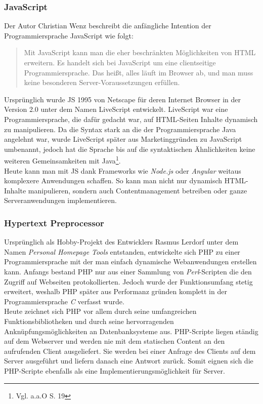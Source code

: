 \subsubsection*{JavaScript} 

Der Autor Christian Wenz beschreibt die anfängliche Intention der Programmiersprache JavaScript wie folgt:

\begin{quote}
Mit JavaScript kann man die eher beschränkten Möglichkeiten von HTML erweitern. Es handelt sich bei JavaScript um eine clientseitige Programmiersprache. Das heißt, alles läuft im Browser ab, und man muss keine besonderen Server-Voraussetzungen erfüllen\autocite[][18]{javascript}.
\end{quote}

Ursprünglich wurde \ac{JS} 1995 von Netscape für deren Internet Browser in der Version 2.0 unter dem Namen LiveScript entwickelt. LiveScript war eine Programmiersprache, die dafür gedacht war, auf \ac{HTML}-Seiten Inhalte dynamisch zu manipulieren. Da die Syntax stark an die der Programmiersprache Java angelehnt war, wurde LiveScript später aus Marketinggründen zu JavaScript umbenannt, jedoch hat die Sprache bis auf die syntaktischen
Ähnlichkeiten keine weiteren Gemeinsamkeiten mit Java\footnote{Vgl. a.a.O S. 19}.
\\
\linebreak
Heute kann man mit \ac{JS} dank Frameworks wie \textit{Node.js} oder \textit{Angular} weitaus komplexere Anwendungen schaffen. So kann man nicht nur dynamisch \ac{HTML}-Inhalte manipulieren, sondern auch Contentmanagement betreiben oder ganze Serveranwendungen implementieren. 

\subsubsection*{Hypertext Preprocessor} 

Ursprünglich als Hobby-Projekt des Entwicklers Rasmus Lerdorf unter dem Namen \textit{Personal Homepage Tools} entstanden, entwickelte sich \ac{PHP} zu einer Programmiersprache mit der man einfach dynamische Webanwendungen erstellen kann. Anfangs bestand \ac{PHP} nur aus einer Sammlung von \textit{Perl}-Scripten die den Zugriff auf Webseiten protokollierten. Jedoch wurde der Funktionsumfang stetig erweitert, weshalb \ac{PHP} später aus Performanz gründen komplett in der Programmiersprache \textit{C} verfasst wurde\autocite[Vgl.][31\psqq]{php}.
\\
\linebreak
Heute zeichnet sich \ac{PHP} vor allem durch seine umfangreichen Funktionsbibliotheken und durch seine hervorragenden Anknüpfungsmöglichkeiten an Datenbanksysteme aus. \ac{PHP}-Scripte liegen ständig auf dem Webserver und werden nie mit dem statischen Content an den aufrufenden Client ausgeliefert. Sie werden bei einer Anfrage des Clients auf dem Server ausgeführt und liefern danach eine Antwort zurück. Somit eignen sich die \ac{PHP}-Scripte ebenfalls als eine Implementierungsmöglichkeit für Server.

